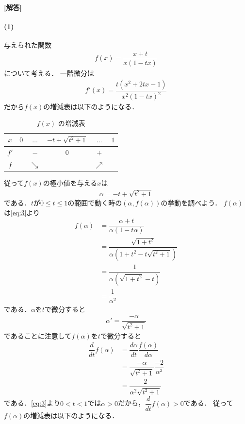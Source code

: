 \documentclass[../../main.tex]{subfiles}
\begin{document}
\begin{oframed}
  
\end{oframed}

{\bf [解答]}
\paragraph{(1)}

与えられた関数
\begin{align}
  f(x) = \dfrac{x+t}{x(1-tx)} \label{eq:1}
\end{align}
について考える．
一階微分は
\begin{align}
  f'(x) = \dfrac{t(x^2 + 2tx - 1)}{x^2 (1-tx)^2} \label{eq:2}
\end{align}
だから$f(x)$の増減表は以下のようになる．
\begin{table}[htb]
  \centering
  \caption{$f(x)$ の増減表}
  \begin{tabular}{c|c|c|c|c|c}
    $x$ & $0$ & $\dots$ & $-t + \sqrt{t^2+1}$ & $\dots$ & $1$ \\ \hline
    $f'$ & & $-$ & $0$ & $+$ & \\ \hline
    $f$ & & $\searrow$ & & $\nearrow$ &
  \end{tabular}
\end{table}
従って$f(x)$の極小値を与える$x$は
\begin{align}
  \alpha = -t + \sqrt{t^2+1} \label{eq:3}
\end{align}
である．$t$が$0\le t \le 1$の範囲で動く時の$(\alpha,f(\alpha))$の挙動を調べよう．
$f(\alpha)$は\cref{eq:3}より
\begin{align}
  f(\alpha)
  &= \dfrac{\alpha+t}{\alpha(1-t\alpha)} \\
  &= \dfrac{\sqrt{1+t^2}}{\alpha(1+t^2-t\sqrt{t^2+1})} \\
  &= \dfrac{1}{\alpha(\sqrt{1+t^2}-t)} \\
  &= \dfrac{1}{\alpha^2} \label{eq:4}
\end{align}
である．$\alpha$を$t$で微分すると
\begin{align}
  \alpha' = \dfrac{-\alpha}{\sqrt{t^2+1}} \label{eq:5}
\end{align}
であることに注意して$f(\alpha)$を$t$で微分すると
\begin{align}
  \dfrac{d}{dt} f(\alpha)
  &= \dfrac{d\alpha}{dt}\dfrac{f(\alpha)}{d\alpha} \\
  &= \dfrac{-\alpha}{\sqrt{t^2+1}}\dfrac{-2}{\alpha^3} \\
  &= \dfrac{2}{\alpha^2\sqrt{t^2+1}}
\end{align}
である．\cref{eq:3}より$0<t<1$では$\alpha>0$だから，$\dfrac{d}{dt} f(\alpha)>0$である．
従って$f(\alpha)$の増減表は以下のようになる．
\end{document}
